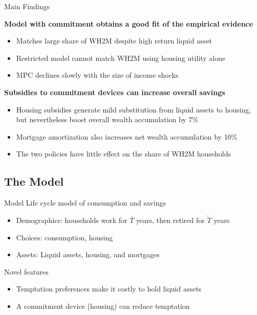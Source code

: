 \documentclass[10pt,english,t,10pt]{beamer}
\begin{document}
\begin{frame} {Main Findings} \label{findings}

\textbf{Model with commitment obtains a good fit of the empirical evidence}
\begin{itemize}
	\medskip
	\item Matches large share of WH2M despite high return liquid asset
	\medskip
	\item Restricted model cannot match WH2M using housing utility alone
	\medskip
	\item MPC declines slowly with the size of income shocks
\end{itemize}
\medskip \medskip \medskip
\pause

\textbf{Subsidies to commitment devices can increase overall savings}
\begin{itemize}
	\medskip
	\item Housing subsidies generate mild substitution from liquid assets to housing, but nevertheless boost overall wealth accumulation by 7\%
	\medskip 
	\item Mortgage amortization also increases net wealth accumulation by 10\%
	\medskip
	\item The two policies have little effect on the share of WH2M households
\end{itemize}



\end{frame}


\subsection{The Model}


\begin{frame}{Model}
\medskip
Life cycle model of consumption and savings
\begin{itemize}
\medskip \medskip
\item Demographics: households work for $\overline{T}$ years, then retired for $\widetilde{T}$ years
\medskip \medskip
\item Choices: consumption, housing
\medskip \medskip
\item Assets: Liquid assets, housing, and mortgages
\medskip \medskip \medskip \medskip
\end{itemize}

\pause
Novel features
\medskip \medskip
\begin{itemize}
\item Temptation preferences make it costly to hold liquid assets
\medskip \medskip
\item A commitment device (housing) can reduce temptation
\end{itemize}
\end{frame}
\end{document}
